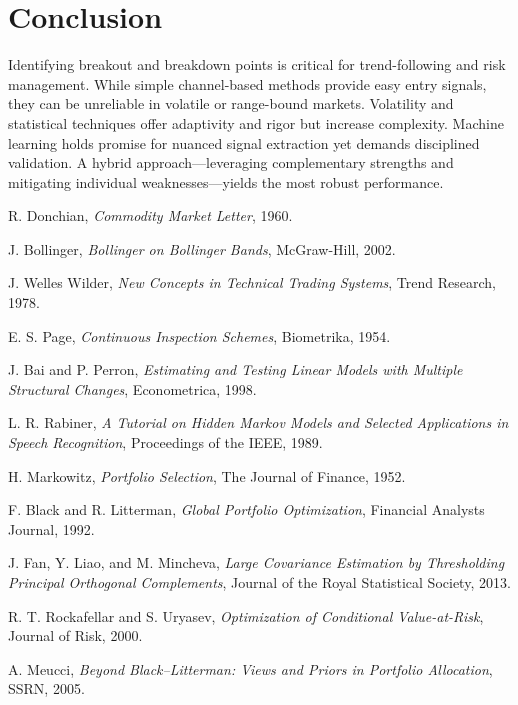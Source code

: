 \documentclass{article}
\begin{document}
\section{Conclusion}
Identifying breakout and breakdown points is critical for trend-following and risk management. While simple channel-based methods provide easy entry signals, they can be unreliable in volatile or range-bound markets. Volatility and statistical techniques offer adaptivity and rigor but increase complexity. Machine learning holds promise for nuanced signal extraction yet demands disciplined validation. A hybrid approach—leveraging complementary strengths and mitigating individual weaknesses—yields the most robust performance.


\begin{thebibliography}{10}

R. Donchian, \textit{Commodity Market Letter}, 1960.

J. Bollinger, \textit{Bollinger on Bollinger Bands}, McGraw-Hill, 2002.

J. Welles Wilder, \textit{New Concepts in Technical Trading Systems}, Trend Research, 1978.

E. S. Page, \textit{Continuous Inspection Schemes}, Biometrika, 1954.

J. Bai and P. Perron, \textit{Estimating and Testing Linear Models with Multiple Structural Changes}, Econometrica, 1998.

L. R. Rabiner, \textit{A Tutorial on Hidden Markov Models and Selected Applications in Speech Recognition}, Proceedings of the IEEE, 1989.

H. Markowitz, \textit{Portfolio Selection}, The Journal of Finance, 1952.

F. Black and R. Litterman, \textit{Global Portfolio Optimization}, Financial Analysts Journal, 1992.

J. Fan, Y. Liao, and M. Mincheva, \textit{Large Covariance Estimation by Thresholding Principal Orthogonal Complements}, Journal of the Royal Statistical Society, 2013.

R. T. Rockafellar and S. Uryasev, \textit{Optimization of Conditional Value-at-Risk}, Journal of Risk, 2000.

A. Meucci, \textit{Beyond Black–Litterman: Views and Priors in Portfolio Allocation}, SSRN, 2005.

\end{thebibliography}
\end{document}
